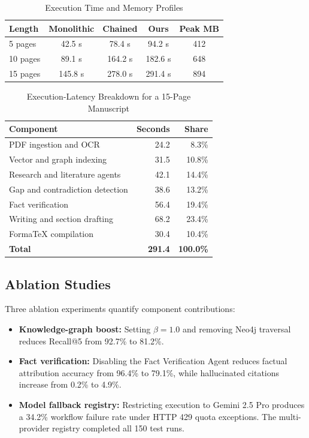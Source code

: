 \documentclass[conference]{IEEEtran}
\begin{document}
\begin{table}[!t]
\caption{Execution Time and Memory Profiles}
\label{tab:latency}
\centering
\footnotesize
\setlength{\tabcolsep}{3pt}
\begin{tabular}{@{}lcccc@{}}
\toprule
\textbf{Length} & \textbf{Monolithic} & \textbf{Chained} & \textbf{Ours} & \textbf{Peak MB} \\
\midrule
5 pages & 42.5 s & 78.4 s & 94.2 s & 412 \\
10 pages & 89.1 s & 164.2 s & 182.6 s & 648 \\
15 pages & 145.8 s & 278.0 s & 291.4 s & 894 \\
\bottomrule
\end{tabular}
\end{table}

\begin{table}[!t]
\caption{Execution-Latency Breakdown for a 15-Page Manuscript}
\label{tab:latency_breakdown}
\centering
\scriptsize
\begin{tabular}{@{}p{}rr@{}}
\toprule
\textbf{Component} & \textbf{Seconds} & \textbf{Share} \\
\midrule
PDF ingestion and OCR & 24.2 & 8.3\% \\
Vector and graph indexing & 31.5 & 10.8\% \\
Research and literature agents & 42.1 & 14.4\% \\
Gap and contradiction detection & 38.6 & 13.2\% \\
Fact verification & 56.4 & 19.4\% \\
Writing and section drafting & 68.2 & 23.4\% \\
FormaTeX compilation & 30.4 & 10.4\% \\
\midrule
\textbf{Total} & \textbf{291.4} & \textbf{100.0\%} \\
\bottomrule
\end{tabular}
\end{table}

\subsection{Ablation Studies}
Three ablation experiments quantify component contributions:
\begin{itemize}
\item \textbf{Knowledge-graph boost:} Setting $\beta = 1.0$ and removing Neo4j traversal reduces Recall@5 from 92.7\% to 81.2\%.
\item \textbf{Fact verification:} Disabling the Fact Verification Agent reduces factual attribution accuracy from 96.4\% to 79.1\%, while hallucinated citations increase from 0.2\% to 4.9\%.
\item \textbf{Model fallback registry:} Restricting execution to Gemini 2.5 Pro produces a 34.2\% workflow failure rate under HTTP 429 quota exceptions. The multi-provider registry completed all 150 test runs.
\end{itemize}
\end{document}
